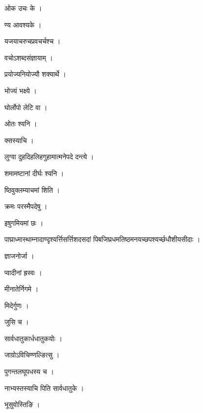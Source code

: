 \documentclass[10pt, openany]{book}
\begin{document}
\noindent ओक उचः के ।

\noindent ण्य आवश्यके ।

\noindent यजयाचरुचप्रवचर्चश्च ।

\noindent वचोऽशब्दसंज्ञायाम् ।

\noindent प्रयोज्यनियोज्यौ शक्यार्थे ।

\noindent भोज्यं भक्ष्ये ।

\noindent घोर्लोपो लेटि वा ।

\noindent ओतः श्यनि ।

\noindent क्सस्याचि ।

\noindent लुग्वा दुहदिहलिहगुहामात्मनेपदे दन्त्ये ।

\noindent शमामष्टानां दीर्घः श्यनि ।

\noindent ष्ठिवुक्लम्याचमां शिति ।

\noindent क्रमः परस्मैपदेषु ।

\noindent इषुगमियमां छः ।

\noindent पाघ्राध्मास्थाम्नादाण्दृश्यर्त्तिसर्त्तिशदसदां पिबजिघ्रधमतिष्ठमनयच्छपश्यर्च्छधौशीयसीदाः ।

\noindent ज्ञाजनोर्जा ।

\noindent प्वादीनां ह्रस्वः ।

\noindent मीनातेर्निगमे ।

\noindent मिदेर्गुणः ।

\noindent जुसि च ।

\noindent सार्वधातुकार्धधातुकयोः ।

\noindent जाग्रोऽविचिण्णल्ङित्सु ।

\noindent पुगन्तलघूपधस्य च ।

\noindent नाभ्यस्तस्याचि पिति सार्वधातुके ।

\noindent भूसुवोस्तिङि ।
\end{document}
